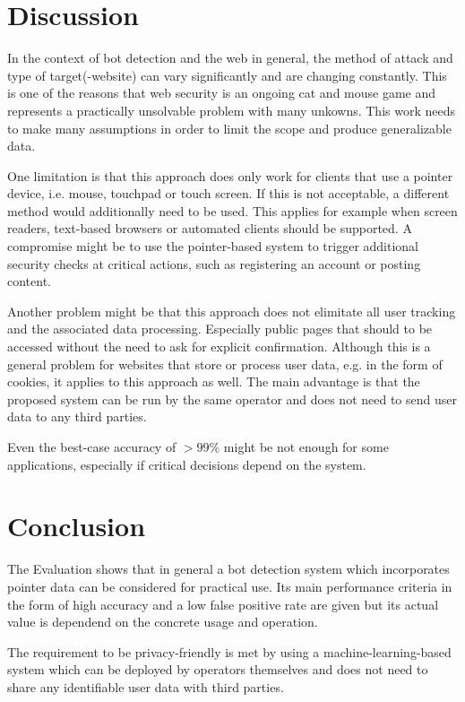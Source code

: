 \documentclass[
    fontsize=12pt,
    headings=small,
    parskip=half,           %
    bibliography=totoc,
    numbers=noenddot,       %
    open=any,               %
    final                   %
]{scrreprt}
\begin{document}
\chapter{Discussion}
In the context of bot detection and the web in general, the method of attack and type of target(-website) can vary significantly and are changing constantly. This is one of the reasons that web security is an ongoing cat and mouse game and represents a practically unsolvable problem with many unkowns. This work needs to make many assumptions in order to limit the scope and produce generalizable data.

One limitation is that this approach does only work for clients that use a pointer device, i.e. mouse, touchpad or touch screen. If this is not acceptable, a different method would additionally need to be used. This applies for example when screen readers, text-based browsers or automated clients should be supported. A compromise might be to use the pointer-based system to trigger additional security checks at critical actions, such as registering an account or posting content.

Another problem might be that this approach does not elimitate all user tracking and the associated data processing. Especially public pages that should to be accessed without the need to ask for explicit confirmation. Although this is a general problem for websites that store or process user data, e.g. in the form of cookies, it applies to this approach as well. The main advantage is that the proposed system can be run by the same operator and does not need to send user data to any third parties.

Even the best-case accuracy of $>99\%$ might be not enough for some applications, especially if critical decisions depend on the system.

\chapter{Conclusion}

The Evaluation shows that in general a bot detection system which incorporates pointer data can be considered for practical use. Its main performance criteria in the form of high accuracy and a low false positive rate are given but its actual value is dependend on the concrete usage and operation.

The requirement to be privacy-friendly is met by using a machine-learning-based system which can be deployed by operators themselves and does not need to share any identifiable user data with third parties.
\end{document}
